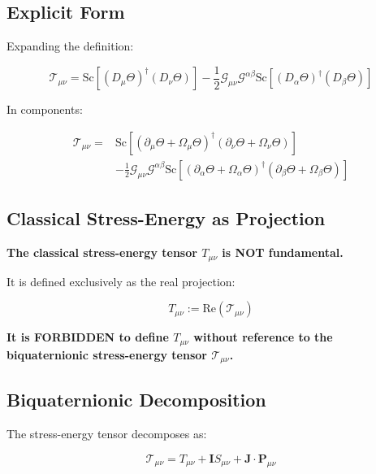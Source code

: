 \subsection{Explicit Form}

Expanding the definition:

\begin{equation}
\mathcal{T}_{\mu\nu} = \text{Sc}[(D_\mu \Theta)^\dagger (D_\nu \Theta)] - \frac{1}{2} \mathcal{G}_{\mu\nu} \mathcal{G}^{\alpha\beta} \text{Sc}[(D_\alpha \Theta)^\dagger (D_\beta \Theta)]
\end{equation}

In components:

\begin{align}
\mathcal{T}_{\mu\nu} = &\text{Sc}[(\partial_\mu \Theta + \Omega_\mu \Theta)^\dagger (\partial_\nu \Theta + \Omega_\nu \Theta)] \\
&- \frac{1}{2} \mathcal{G}_{\mu\nu} \mathcal{G}^{\alpha\beta} \text{Sc}[(\partial_\alpha \Theta + \Omega_\alpha \Theta)^\dagger (\partial_\beta \Theta + \Omega_\beta \Theta)]
\end{align}

\subsection{Classical Stress-Energy as Projection}

\begin{tcolorbox}[colback=red!5!white,colframe=red!75!black,title=Prohibition]
\textbf{The classical stress-energy tensor $T_{\mu\nu}$ is NOT fundamental.}

It is defined exclusively as the real projection:

\begin{equation}
\label{eq:canonical:stress_projection}
\boxed{T_{\mu\nu} := \text{Re}(\mathcal{T}_{\mu\nu})}
\end{equation}

\textbf{It is FORBIDDEN to define $T_{\mu\nu}$ without reference to the biquaternionic stress-energy tensor $\mathcal{T}_{\mu\nu}$.}
\end{tcolorbox}

\subsection{Biquaternionic Decomposition}

The stress-energy tensor decomposes as:

\begin{equation}
\mathcal{T}_{\mu\nu} = T_{\mu\nu} + \mathbf{I} S_{\mu\nu} + \mathbf{J} \cdot \mathbf{P}_{\mu\nu}
\end{equation}

